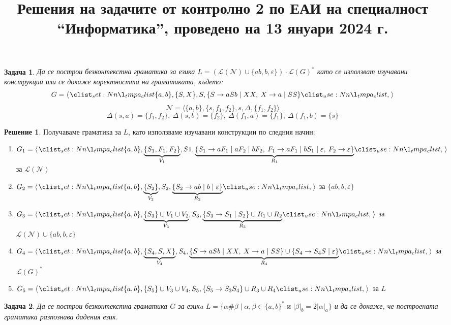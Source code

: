 \documentclass{article}
\newtheorem{problem}{Задача}
\theoremstyle{definition}
\newtheorem*{solution}{Решение}
\begin{document}
\title{Решения на задачите от контролно 2 по ЕАИ на специалност ``Информатика'', проведено на 13 януари 2024 г.}
\date{}

\maketitle

\begin{problem}
Да се построи безконтекстна граматика за езика $L = (\mathcal{L}(\mathcal{N}) \cup \{ab, b, \varepsilon\}) \cdot \mathcal{L}(G)^*$ като се използват изучавани конструкции или се докаже коректността на граматиката, където:
$$G=\opair{ \{a,b\}, \{S,X\}, S, \{S \rightarrow aSb \mid XX, \: X \rightarrow a \mid SS\}}$$
$$\mathcal{N} = \langle \{a,b\}, \{s, f_1, f_2\}, s, \Delta, \{f_1, f_2\} \rangle$$
$$\Delta(s, a) = \{f_1, f_2\}, \: \Delta(s,b)=\{f_2\}, \: \Delta(f_1, a)=\{f_1\}, \: \Delta(f_1,b) = \{s\} $$
\end{problem}

\begin{solution}
    Получаваме граматика за $L$, като използваме изучавани конструкции по следния начин:
    \begin{enumerate}
        \item $G_1 = \opair{\{a,b\}, \underbrace{\{ S_1, F_1, F_2\}}_{V_1}, S1, \underbrace{\{ S_1 \rightarrow aF_1 \mid aF_2 \mid bF_2, \: F_1 \rightarrow aF_1 \mid bS_1 \mid \varepsilon, \: F_2 \rightarrow \varepsilon\}}_{R_1}}$ за $\mathcal{L(N)}$
        \item $G_2 = \opair{\{a,b\}, \underbrace{\{ S_2\}}_{V_2}, S_2, \underbrace{\{ S_2 \rightarrow ab \mid b \mid \varepsilon \}}_{R_2}}$ за $\{ ab, b, \varepsilon \}$
        \item $G_3 = \opair{\{a,b\}, \underbrace{\{ S_3 \} \cup V_1 \cup V_2 }_{V_3}, S_3, \underbrace{\{S_3 \rightarrow S_1 \mid S_2 \} \cup R_1 \cup R_2}_{R_3}}$ за $\mathcal{L(N)} \cup \{ ab, b, \varepsilon \}$
        \item $G_4 = \opair{\{a,b\}, \underbrace{\{ S_4, S, X \} }_{V_4}, S_4, \underbrace{\{S \rightarrow aSb \mid XX, \: X \rightarrow a \mid SS\} \cup \{ S_4 \rightarrow S_4S \mid \varepsilon \}}_{R_4}}$ за $\mathcal{L}(G)^*$
        \item $G_5 = \opair{\{a,b\}, \{ S_5 \} \cup V_3 \cup V_4, S_5, \{ S_5 \rightarrow S_3 S_4 \} \cup R_3 \cup R_4}$ за $L$
    \end{enumerate}
\end{solution}

\begin{problem}
Да се построи безконтекстна граматика $G$ за езикa $L = \{\alpha \# \beta \mid \alpha, \beta \in \{a,b\}^* \text{ и } |\beta|_b = 2|\alpha|_a\}$ и да се докаже, че построената граматика разпознава дадения език.
\end{problem}
\end{document}
